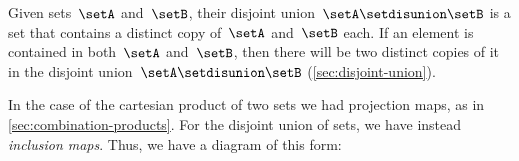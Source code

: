 %
%
%
%

Given sets~$\setA$ and~$\setB$, their disjoint union~$\setA \setdisunion \setB$ is a set that contains a distinct copy of~$\setA$ and~$\setB$ each.
If an element is contained in both~$\setA$ and~$\setB$, then there will be two distinct copies of it in the disjoint union~$\setA \setdisunion \setB$ (\cref{sec:disjoint-union}).


In the case of the cartesian product of two sets we had projection maps, as in \cref{sec:combination-products}.
For the disjoint union of sets, we have instead \emph{inclusion maps}.
Thus, we have a diagram of this form:

